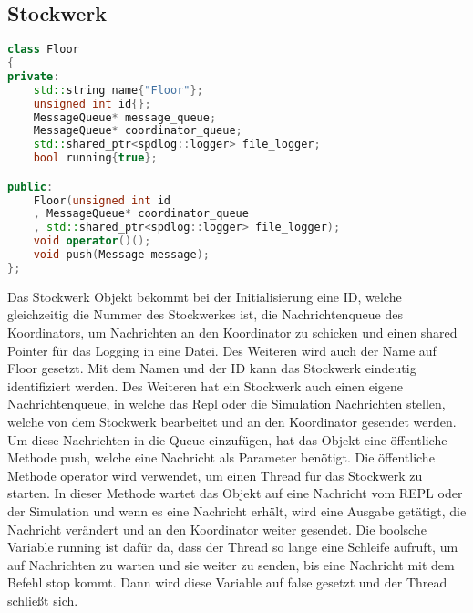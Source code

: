 \subsection{Stockwerk}

\begin{lstlisting}[language=C++]
class Floor
{
private:
    std::string name{"Floor"};
    unsigned int id{};
    MessageQueue* message_queue;
    MessageQueue* coordinator_queue;
    std::shared_ptr<spdlog::logger> file_logger;
    bool running{true};

public:
    Floor(unsigned int id
    , MessageQueue* coordinator_queue
    , std::shared_ptr<spdlog::logger> file_logger);
    void operator()();
    void push(Message message);
};
\end{lstlisting}

\vspace{5mm}

Das Stockwerk Objekt bekommt bei der Initialisierung eine ID, welche gleichzeitig die Nummer des Stockwerkes ist, die Nachrichtenqueue des Koordinators, um Nachrichten an den Koordinator zu schicken und einen shared Pointer für das Logging in eine Datei. Des Weiteren wird auch der Name auf Floor gesetzt. Mit dem Namen und der ID kann das Stockwerk eindeutig identifiziert werden. Des Weiteren hat ein Stockwerk auch einen eigene Nachrichtenqueue, in welche das Repl oder die Simulation Nachrichten stellen, welche von dem Stockwerk bearbeitet und an den Koordinator gesendet werden. Um diese Nachrichten in die Queue einzufügen, hat das Objekt eine öffentliche Methode push, welche eine Nachricht als Parameter benötigt. Die öffentliche Methode operator wird verwendet, um einen Thread für das Stockwerk zu starten. In dieser Methode wartet das Objekt auf eine Nachricht vom REPL oder der Simulation und wenn es eine Nachricht erhält, wird eine Ausgabe getätigt, die Nachricht verändert und an den Koordinator weiter gesendet. Die boolsche Variable running ist dafür da, dass der Thread so lange eine Schleife aufruft, um auf Nachrichten zu warten und sie weiter zu senden, bis eine Nachricht mit dem Befehl stop kommt. Dann wird diese Variable auf false gesetzt und der Thread schließt sich.